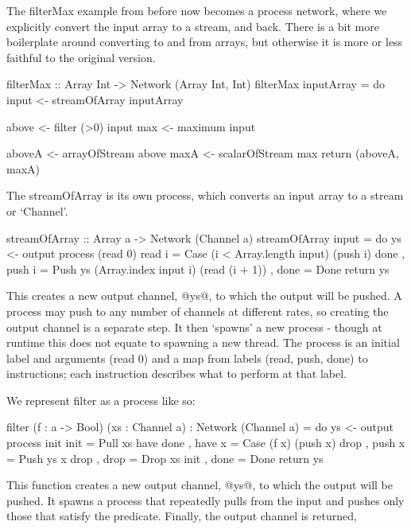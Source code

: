 The filterMax example from before now becomes a process network, where we explicitly convert the input array to a stream, and back.
There is a bit more boilerplate around converting to and from arrays, but otherwise it is more or less faithful to the original version.
\begin{code}
filterMax :: Array Int -> Network (Array Int, Int)
filterMax inputArray
 = do input  <- streamOfArray  inputArray

      above  <- filter (>0)    input
      max    <- maximum        input

      aboveA <- arrayOfStream  above
      maxA   <- scalarOfStream max
      return (aboveA, maxA)
\end{code}

The streamOfArray is its own process, which converts an input array to a stream or `Channel'.
\begin{code}
streamOfArray :: Array a -> Network (Channel a)
streamOfArray input
 = do ys <- output
      process (read 0)
       { read i = Case (i < Array.length input) (push i) done
       , push i = Push ys (Array.index input i) (read (i + 1))
       , done   = Done
       }
      return ys
\end{code}

This creates a new output channel, @ys@, to which the output will be pushed.
A process may push to any number of channels at different rates, so creating the output channel is a separate step.
It then `spawns' a new process - though at runtime this does not equate to spawning a new thread.
The process is an initial label and arguments (read 0) and a map from labels (read, push, done) to instructions; each instruction describes what to perform at that label.



We represent filter as a process like so:
\begin{code}
filter (f : a -> Bool) (xs : Channel a) : Network (Channel a)
 = do ys <- output
      process init
       { init   = Pull xs have done
       , have x = Case (f x) (push x) drop
       , push x = Push ys x drop
       , drop   = Drop xs init
       , done   = Done
       }
      return ys
\end{code}

This function creates a new output channel, @ys@, to which the output will be pushed. 
It spawns a process that repeatedly pulls from the input and pushes only those that satisfy the predicate.
Finally, the output channel is returned,


